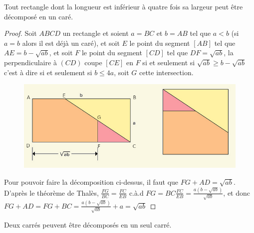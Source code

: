 \begin{li}
  Tout rectangle dont la longueur est inférieur à quatre fois sa largeur peut être décomposé en un caré.
\end{li}
\begin{proof}
Soit $ABCD$ un rectangle et soient $a=BC$ et $b=AB$ tel que $a<b$ (si $a=b$ alors il est déjà un caré), et soit $E$ le point du segment $[AB]$ tel que $AE = b-\sqrt{ab}$, et soit $F$ le point du segment $[CD]$ tel que $DF = \sqrt{ab}$, la perpendiculaire à $(CD)$ coupe $[CE]$ en $F$ si et seulement si $\sqrt{ab} \ge b-\sqrt{ab}$ c'est à dire si et seulement si $b \le 4a$, soit $G$ cette intersection.
\begin{figure}[h]
    \centering
    \includegraphics[scale=0.6]{images/xx3.png}

\end{figure}

Pour pouvoir faire la décomposition ci-dessus, il faut que $FG +AD = \sqrt{ab}$. D'après le théorème de Thalès, $\frac{FG}{BC} = \frac{FC}{EB}$
c.à.d $FG = BC\frac{FC}{EB} = \frac{a(b-\sqrt{ab})}{\sqrt{ab}}$, et donc $FG +AD= FG + BC = \frac{a(b-\sqrt{ab})}{\sqrt{ab}} +a = \sqrt{ab}$
\end{proof}
\begin{li}
  Deux carrés peuvent être décomposés en un seul carré.
\end{li}
